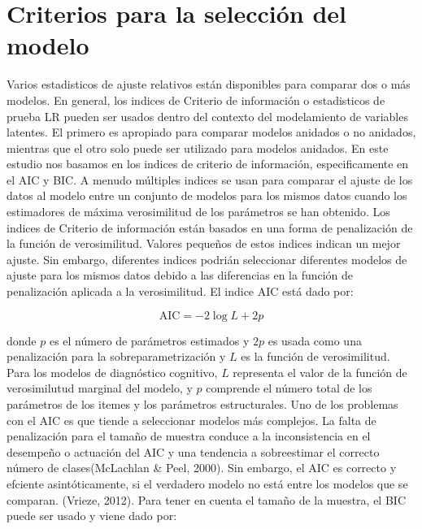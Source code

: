 	\section{Criterios para la selecci\'{o}n del modelo}
	Varios estadisticos de ajuste relativos est\'{a}n disponibles para comparar dos o m\'{a}s modelos. En general, los indices de Criterio de informaci\'{o}n o estadisticos de prueba LR pueden ser usados dentro del contexto del modelamiento de variables latentes. El primero es apropiado para comparar modelos anidados o no anidados, mientras que el otro solo puede ser utilizado para modelos anidados.
	En este estudio nos basamos en los indices de criterio de informaci\'{o}n, especificamente en el AIC y BIC. A menudo m\'{u}ltiples indices se usan para comparar el ajuste de los datos al modelo entre un conjunto de modelos para los mismos datos cuando los estimadores de m\'{a}xima verosimilitud de los par\'{a}metros se han obtenido.
	Los indices de Criterio de informaci\'{o}n est\'{a}n basados en una forma de penalizaci\'{o}n de la funci\'{o}n de verosimilitud. Valores peque\~{n}os de estos indices indican un mejor ajuste. Sin embargo, diferentes indices podri\'{a}n seleccionar diferentes modelos de ajuste para los mismos datos debido a las diferencias en la funci\'{o}n de penalizaci\'{o}n aplicada a la verosimilitud. El indice AIC est\'{a} dado por:
	
	\begin{equation}
		\mathrm{AIC}=-2 \log L+2 p 
		\label{3.17}
	\end{equation}
	
	donde $p$ es el n\'{u}mero de par\'{a}metros estimados y $2p$ es usada como una penalizaci\'{o}n para la sobreparametrizaci\'{o}n y $L$ es la funci\'{o}n de verosimilitud. Para los modelos de diagn\'{o}stico cognitivo, $L$ representa el valor de la funci\'{o}n de verosimilutud marginal del modelo, y $p$ comprende el n\'{u}mero total de los par\'{a}metros de los itemes y los par\'{a}metros estructurales. Uno de los problemas con el AIC es que tiende a seleccionar modelos m\'{a}s complejos. La falta de penalizaci\'{o}n para el tama\~{n}o de muestra conduce a la inconsistencia en el desempe\~{n}o o actuaci\'{o}n del AIC y una tendencia a sobreestimar el correcto n\'{u}mero de clases(McLachlan \& Peel, 2000).
	Sin embargo, el AIC es correcto y efciente asint\'{o}ticamente, si el verdadero modelo no est\'{a} entre los modelos que se comparan. (Vrieze, 2012). 
	Para tener en cuenta el tama\~{n}o de la muestra, el BIC puede ser usado y viene dado por:         
	
